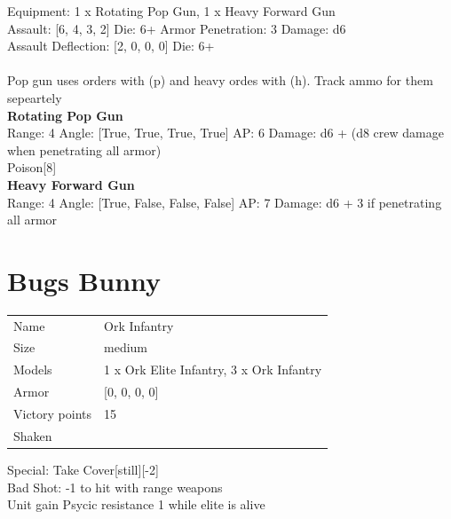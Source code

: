 Equipment: 1 x Rotating Pop Gun, 1 x Heavy Forward Gun \\

Assault: [6, 4, 3, 2] Die: 6+ Armor Penetration: 3 Damage: d6 \\
Assault Deflection: [2, 0, 0, 0] Die: 6+\\
\\ 
 

Pop gun uses orders with (p) and heavy ordes with (h). Track ammo for them sepeartely\\ 


{\bf Rotating Pop Gun } \\



Range: 4  Angle: [True, True, True, True] AP: 6 Damage: d6 + (d8 crew damage when penetrating all armor) \\
Poison[8]\\ 




{\bf Heavy Forward Gun } \\



Range: 4  Angle: [True, False, False, False] AP: 7 Damage: d6 + 3 if penetrating all armor \\




 















\clearpage

\section{ Bugs Bunny }

\begin{tabular}{ll}
  Name & Ork Infantry \\
  Size & medium\\
  Models & 1 x Ork Elite Infantry, 3 x Ork Infantry\\
  Armor & [0, 0, 0, 0]\\
  Victory points & 15\\
  Shaken & \\
\end{tabular}
Special:
Take Cover[still][-2]\\ 
Bad Shot: -1 to hit with range weapons\\ 
Unit gain Psycic resistance 1 while elite is alive\\ 


